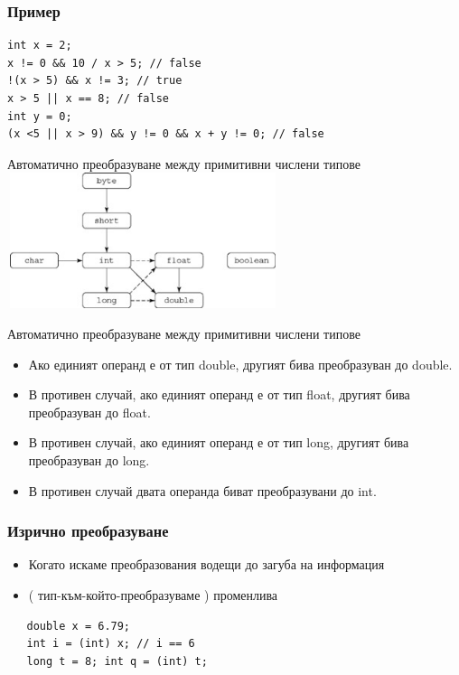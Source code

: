 \documentclass{beamer}
\begin{document}
\begin{frame}[fragile]
  \frametitle{Пример}
  \transdissolve
\begin{lstlisting}
int x = 2;
x != 0 && 10 / x > 5; // false
!(x > 5) && x != 3; // true
x > 5 || x == 8; // false
int y = 0;
(x <5 || x > 9) && y != 0 && x + y != 0; // false
\end{lstlisting}
\end{frame}

\begin{frame}{{Автоматично преобразуване между примитивни числени типове}}
  \transdissolve
  \includegraphics[height=150px, width=300px]{images/conversions.jpg}
\end{frame}

\begin{frame}{Автоматично преобразуване между примитивни числени типове}
  \transdissolve
  \begin{itemize}
    \item Ако единият операнд е от тип double, другият бива
      преобразуван до double.
    \item В противен случай, ако единият операнд е от тип float,
      другият бива преобразуван до float.
    \item В противен случай, ако единият операнд е от тип long,
      другият бива преобразуван до long.
    \item В противен случай двата операнда биват преобразувани до int.
  \end{itemize}
\end{frame}

\begin{frame}[fragile]
  \frametitle{Изрично преобразуване}
  \transdissolve
  \begin{itemize}
  \item Когато искаме преобразования водещи
    до загуба на информация
  \item ( тип-към-който-преобразуваме ) променлива
  \end{itemize}
  \begin{lstlisting}
   double x = 6.79;
   int i = (int) x; // i == 6
   long t = 8; int q = (int) t;
  \end{lstlisting}
\end{frame}
\end{document}

